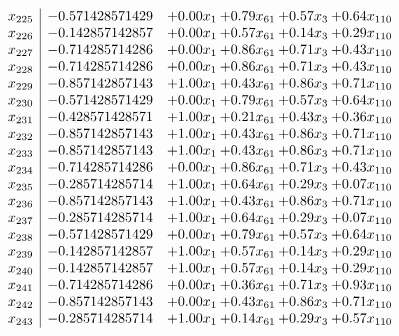 \documentclass[8pt]{article}
\begin{document}
\[\begin{array}{c| c c@{\hskip 2pt} c@{\hskip 2pt} c@{\hskip 2pt} c@{\hskip 2pt} }
 x_{225}   &  -0.571428571429 & +  0.00 x_{1} & +  0.79 x_{61} & +  0.57 x_{3} & +  0.64 x_{110}\\
 x_{226}   &  -0.142857142857 & +  0.00 x_{1} & +  0.57 x_{61} & +  0.14 x_{3} & +  0.29 x_{110}\\
 x_{227}   &  -0.714285714286 & +  0.00 x_{1} & +  0.86 x_{61} & +  0.71 x_{3} & +  0.43 x_{110}\\
 x_{228}   &  -0.714285714286 & +  0.00 x_{1} & +  0.86 x_{61} & +  0.71 x_{3} & +  0.43 x_{110}\\
 x_{229}   &  -0.857142857143 & +  1.00 x_{1} & +  0.43 x_{61} & +  0.86 x_{3} & +  0.71 x_{110}\\
 x_{230}   &  -0.571428571429 & +  0.00 x_{1} & +  0.79 x_{61} & +  0.57 x_{3} & +  0.64 x_{110}\\
 x_{231}   &  -0.428571428571 & +  1.00 x_{1} & +  0.21 x_{61} & +  0.43 x_{3} & +  0.36 x_{110}\\
 x_{232}   &  -0.857142857143 & +  1.00 x_{1} & +  0.43 x_{61} & +  0.86 x_{3} & +  0.71 x_{110}\\
 x_{233}   &  -0.857142857143 & +  1.00 x_{1} & +  0.43 x_{61} & +  0.86 x_{3} & +  0.71 x_{110}\\
 x_{234}   &  -0.714285714286 & +  0.00 x_{1} & +  0.86 x_{61} & +  0.71 x_{3} & +  0.43 x_{110}\\
 x_{235}   &  -0.285714285714 & +  1.00 x_{1} & +  0.64 x_{61} & +  0.29 x_{3} & +  0.07 x_{110}\\
 x_{236}   &  -0.857142857143 & +  1.00 x_{1} & +  0.43 x_{61} & +  0.86 x_{3} & +  0.71 x_{110}\\
 x_{237}   &  -0.285714285714 & +  1.00 x_{1} & +  0.64 x_{61} & +  0.29 x_{3} & +  0.07 x_{110}\\
 x_{238}   &  -0.571428571429 & +  0.00 x_{1} & +  0.79 x_{61} & +  0.57 x_{3} & +  0.64 x_{110}\\
 x_{239}   &  -0.142857142857 & +  1.00 x_{1} & +  0.57 x_{61} & +  0.14 x_{3} & +  0.29 x_{110}\\
 x_{240}   &  -0.142857142857 & +  1.00 x_{1} & +  0.57 x_{61} & +  0.14 x_{3} & +  0.29 x_{110}\\
 x_{241}   &  -0.714285714286 & +  0.00 x_{1} & +  0.36 x_{61} & +  0.71 x_{3} & +  0.93 x_{110}\\
 x_{242}   &  -0.857142857143 & +  0.00 x_{1} & +  0.43 x_{61} & +  0.86 x_{3} & +  0.71 x_{110}\\
 x_{243}   &  -0.285714285714 & +  1.00 x_{1} & +  0.14 x_{61} & +  0.29 x_{3} & +  0.57 x_{110}\\

\end{array}\]
\end{document}
